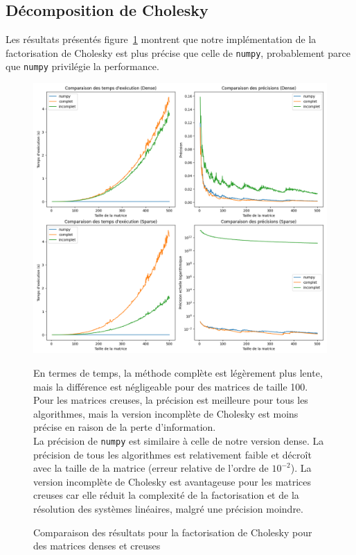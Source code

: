 \documentclass{article}
\begin{document}
\subsection{Décomposition de Cholesky}
Les résultats présentés figure~\ref{fig:cholesky} montrent que notre implémentation de la factorisation de Cholesky est plus précise que celle de \texttt{numpy}, probablement parce que \texttt{numpy} privilégie la performance.
\begin{figure}[H]
  \begin{minipage}{0.6\textwidth}
    \centering
    \includegraphics[width=\textwidth]{img/cholesky_all.png}
    \caption{Comparaison des résultats pour la factorisation de Cholesky pour des matrices denses et creuses}
    \label{fig:cholesky}
  \end{minipage}
  \hfill
  \begin{minipage}{0.35\textwidth}
     En termes de temps, la méthode complète est légèrement plus lente, mais la différence est négligeable pour des matrices de taille 100. Pour les matrices creuses, la précision est meilleure pour tous les algorithmes, mais la version incomplète de Cholesky est moins précise en raison de la perte d'information. \\
    La précision de \texttt{numpy} est similaire à celle de notre version dense. La précision de tous les algorithmes est relativement faible et décroît avec la taille de la matrice (erreur relative de l'ordre de \(10^{-2}\)). La version incomplète de Cholesky est avantageuse pour les matrices creuses car elle réduit la complexité de la factorisation et de la résolution des systèmes linéaires, malgré une précision moindre.
  \end{minipage}
\end{figure}
\end{document}
